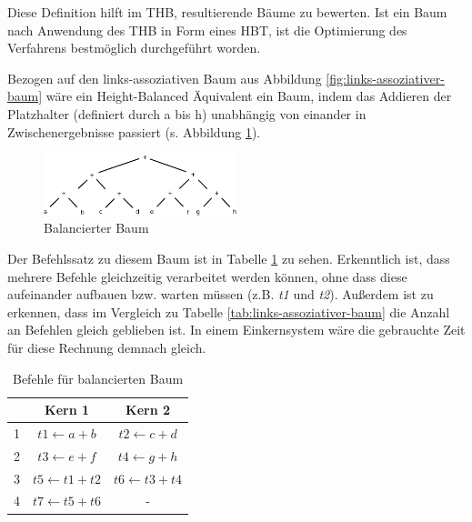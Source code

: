 Diese Definition hilft im \ac{THB}, resultierende Bäume zu bewerten. Ist ein Baum nach Anwendung des \ac{THB} in Form eines HBT, ist die Optimierung des Verfahrens bestmöglich durchgeführt worden.

Bezogen auf den links-assoziativen Baum aus Abbildung \ref{fig:links-assoziativer-baum}\cite{HeBIS-309344573} wäre ein Height-Balanced Äquivalent ein Baum, indem das Addieren der Platzhalter (definiert durch a bis h) unabhängig von einander in Zwischenergebnisse passiert (s. Abbildung \ref{fig:balancierter-baum}\cite{HeBIS-309344573}).

\begin{figure}
	\begin{center}
		\includegraphics[width=0.5\textwidth]{images/balanced}
	\end{center}
	\caption{Balancierter Baum}
	\label{fig:balancierter-baum}
\end{figure}

Der Befehlssatz zu diesem Baum ist in Tabelle \ref{tab:balancierter-baum} zu sehen. Erkenntlich ist, dass mehrere Befehle gleichzeitig verarbeitet werden können, ohne dass diese aufeinander aufbauen bzw. warten müssen (z.B. \textit{t1} und \textit{t2}). Außerdem ist zu erkennen, dass im Vergleich zu Tabelle \ref{tab:links-assoziativer-baum} die Anzahl an Befehlen gleich geblieben ist. In einem Einkernsystem wäre die gebrauchte Zeit für diese Rechnung demnach gleich.

\begin{table}
	\begin{center}
		\begin{tabular}{|c|c|c|}
			\hline  & Kern 1 & Kern 2 \\ 
			\hline 1 & $ t1 \leftarrow a + b $ & $ t2 \leftarrow c + d $ \\ 
			\hline 2 & $ t3 \leftarrow e + f $ & $ t4 \leftarrow g + h $ \\ 
			\hline 3 & $ t5 \leftarrow t1 + t2 $ & $ t6 \leftarrow t3 + t4 $\\ 
			\hline 4 & $ t7 \leftarrow t5 + t6 $ &  -\\ 
			\hline 
		\end{tabular}
	\end{center}
	\caption{Befehle für balancierten Baum}
	\label{tab:balancierter-baum}
\end{table}
